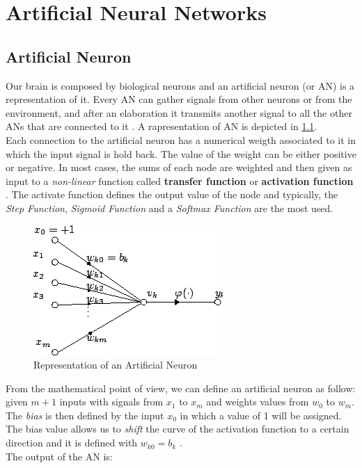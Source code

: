 \chapter{Artificial Neural Networks}
\section{Artificial Neuron}
Our brain is composed by biological neurons and an artificial neuron (or AN) is a representation of it. Every AN can gather signals from other neurons or from the environment, and after an elaboration it transmits another signal to all the other ANs that are connected to it \cite{engelbrecht2007computational}. A rapresentation of AN is depicted in \ref{fig:artificial_neuron}. \\
Each connection to the artificial neuron has a numerical weigth associated to it in which the input signal is hold back. The value of the weight can be either positive or negative. In most cases, the sums of each node are weighted and then given as input to a \textit{non-linear} function called \textbf{transfer function} or \textbf{activation function} \cite{artificial_neuron_wiki}. The activate function defines the output value of the node and typically, the \textit{Step Function}, \textit{Sigmoid Function} and a \textit{Softmax Function} are the most used.

\begin{figure}[!ht]
    \centering
    \includegraphics[scale=0.5]{Figures/artificial_neuron.png}
    \caption{Representation of an Artificial Neuron \cite{artificial_neuron_wiki}}
    \label{fig:artificial_neuron}
\end{figure}

\noindent From the mathematical point of view, we can define an artificial neuron as follow: \\
given $m+1$ inputs with signals from $x_1$ to $x_m$ and weights values from $w_0$ to $w_m$. The \textit{bias} is then defined by the input $x_0$ in which a value of 1 will be assigned. The bias value allows us to \textit{shift} the curve of the activation function to a certain direction and it is defined with $w_{k0} = b_k$ \cite{artificial_neuron_wiki}. \\
The output of the AN is:


